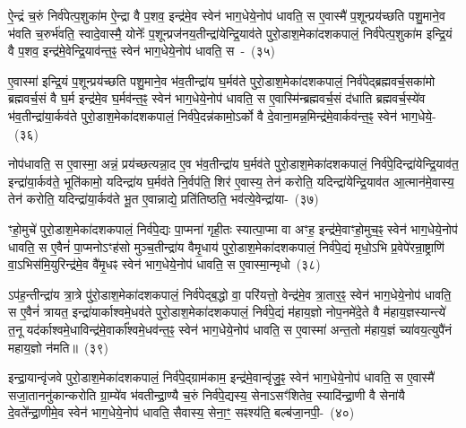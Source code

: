 ऐ॒न्द्रं च॒रुं निर्व॑पेत्प॒शुका॑म ऐ॒न्द्रा वै प॒शव॒ इन्द्र॑मे॒व स्वेन॑ भाग॒धेये॒नोप॑ धावति॒ स ए॒वास्मै॑ प॒शून्प्रय॑च्छति पशु॒माने॒व भ॑वति च॒रुर्भ॑वति॒ स्वादे॒वास्मै॒ योनेः᳚ प॒शून्प्रज॑नय॒तीन्द्रा॑येन्द्रि॒याव॑ते पुरो॒डाश॒मेका॑\-दश\-कपालं॒ निर्व॑पेत्प॒शुका॑म इन्द्रि॒यं वै प॒शव॒ इन्द्र॑मे॒वेन्द्रि॒याव॑न्त॒ꣴ॒ स्वेन॑ भाग॒धेये॒नोप॑ धावति॒ स~-~(३५)\ip

ए॒वास्मा॑ इन्द्रि॒यं प॒शून्प्रय॑च्छति पशु॒माने॒व भ॑व॒तीन्द्रा॑य घ॒र्मव॑ते पुरो॒डाश॒मेका॑\-दश\-कपालं॒ निर्व॑पेद्ब्रह्मवर्च॒सका॑मो ब्रह्मवर्च॒सं वै घ॒र्म इन्द्र॑मे॒व घ॒र्मव॑न्त॒ꣴ॒ स्वेन॑ भाग॒धेये॒नोप॑ धावति॒ स ए॒वास्मि॑न्ब्रह्मवर्च॒सं द॑धाति ब्रह्मवर्च॒स्ये॑व भ॑व॒तीन्द्रा॑या॒र्कव॑ते पुरो॒डाश॒मेका॑\-दश\-कपालं॒ निर्व॑पे॒दन्न॑कामो॒\-ऽर्को वै दे॒वाना॒मन्न॒मिन्द्र॑मे॒वार्कव॑न्त॒ꣴ॒ स्वेन॑ भाग॒धेये॒-~(३६)\ip

नोप॑धावति॒ स ए॒वास्मा॒ अन्नं॒ प्रय॑च्छत्यन्ना॒द ए॒व भ॑व॒तीन्द्रा॑य घ॒र्मव॑ते पुरो॒डाश॒मेका॑\-दश\-कपालं॒ निर्व॑पे॒दिन्द्रा॑येन्द्रि॒याव॑त॒ इन्द्रा॑\-या॒र्कव॑ते॒ भूति॑कामो॒ यदिन्द्रा॑य घ॒र्मव॑ते नि॒र्वप॑ति॒ शिर॑ ए॒वास्य॒ तेन॑ करोति॒ यदिन्द्रा॑येन्द्रि॒याव॑त आ॒त्मान॑मे॒वास्य॒ तेन॑ करोति॒ यदिन्द्रा॑या॒र्कव॑ते भू॒त ए॒वान्नाद्ये॒ प्रति॑तिष्ठति॒ भव॑त्ये॒वेन्द्रा॑या-~(३७)\ip

ꣳहो॒मुचे॑ पुरो॒डाश॒मेका॑\-दश\-कपालं॒ निर्व॑पे॒द्यः पा॒प्मना॑ गृही॒तः स्यात्पा॒प्मा वा अꣳह॒ इन्द्र॑मे॒वाꣳहो॒मुच॒ꣴ॒ स्वेन॑ भाग॒धेये॒नोप॑ धावति॒ स ए॒वैनं॑ पा॒प्मनो\-ऽꣳह॑सो मुञ्च॒तीन्द्रा॑य वैमृ॒धाय॑ पुरो॒डाश॒मेका॑\-दश\-कपालं॒ निर्व॑पे॒द्यं मृधो॒\-ऽभि प्र॒वेपे॑रन्रा॒ष्ट्राणि॑ वा॒\-ऽभिस॑मि॒युरिन्द्र॑मे॒व वै॑मृ॒धꣴ स्वेन॑ भाग॒धेये॒नोप॑ धावति॒ स ए॒वास्मा॒न्मृधो~(३८)\ip

ऽप॑ह॒न्तीन्द्रा॑य त्रा॒त्रे पु॑रो॒डाश॒मेका॑\-दश\-कपालं॒ निर्व॑पेद्ब॒द्धो वा॒ परि॑यत्तो॒ वेन्द्र॑मे॒व त्रा॒तार॒ꣴ॒ स्वेन॑ भाग॒धेये॒नोप॑ धावति॒ स ए॒वैनं॑ त्रायत॒ इन्द्रा॑यार्काश्वमे॒धव॑ते पुरो॒डाश॒मेका॑\-दश\-कपालं॒ निर्व॑पे॒द्यं म॑हाय॒ज्ञो नोप॒नमे॑दे॒ते वै म॑हाय॒ज्ञस्यान्त्ये॑ त॒नू यद॑र्काश्वमे॒धाविन्द्र॑मे॒वार्का᳚श्वमे॒धव॑न्त॒ꣴ॒ स्वेन॑ भाग॒धेये॒नोप॑ धावति॒ स ए॒वास्मा॑ अन्त॒तो म॑हाय॒ज्ञं च्या॑वय॒त्युपै॑नं महाय॒ज्ञो न॑मति॥~(३९)\ip

{\anuvakamend[{इ॒न्द्रि॒याव॑न्त॒ꣴ॒ स्वेन॑ भाग॒धेये॒नोप॑ धावति॒ सो᳚\-ऽर्कव॑न्त॒ꣴ॒ स्वेन॑ भाग॒धेये॑नै॒वेन्द्रा॑यास्मा॒न्मृधो᳚\-ऽस्मै स॒प्त च॑}]}

इन्द्रा॒यान्वृ॑जवे पुरो॒डाश॒मेका॑\-दश\-कपालं॒ निर्व॑पे॒द्ग्राम॑काम॒ इन्द्र॑मे॒वान्वृ॑जु॒ꣴ॒ स्वेन॑ भाग॒धेये॒नोप॑ धावति॒ स ए॒वास्मै॑ सजा॒ताननु॑कान्करोति ग्रा॒म्ये॑व भ॑वतीन्द्रा॒ण्यै च॒रुं निर्व॑पे॒द्यस्य॒ सेना\-ऽसꣳ॑शितेव॒ स्यादि॑न्द्रा॒णी वै सेना॑यै दे॒वते᳚न्द्रा॒णीमे॒व स्वेन॑ भाग॒धेये॒नोप॑ धावति॒ सैवास्य॒ सेना॒ꣳ॒ सꣴश्य॑ति॒ बल्ब॑जा॒नपी॒-~(४०)\ip

